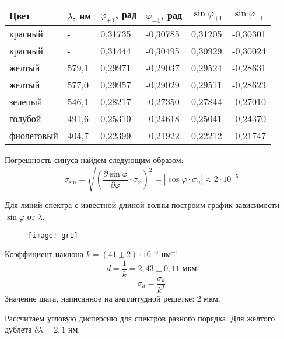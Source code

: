 	\begin{table}[H]
		\centering
		\begin{tabular}{|l|l|l|l|l|l|}
			\hline
			Цвет       & $\lambda$, нм & $\varphi_{+1}$, рад & $\varphi_{-1}$, рад & $\sin{\varphi_{+1}}$ & $\sin{\varphi_{-1}}$ \\ \hline
			красный    & -             & 0,31735             & -0,30785            & 0,31205              & -0,30301             \\ \hline
			красный    & -             & 0,31444             & -0,30495            & 0,30929              & -0,30024             \\ \hline
			желтый     & 579,1         & 0,29971             & -0,29037            & 0,29524              & -0,28631             \\ \hline
			желтый     & 577,0         & 0,29957             & -0,29029            & 0,29511              & -0,28623             \\ \hline
			зеленый    & 546,1         & 0,28217             & -0,27350            & 0,27844              & -0,27010             \\ \hline
			голубой    & 491,6         & 0,25310             & -0,24618            & 0,25041              & -0,24370             \\ \hline
			фиолетовый & 404,7         & 0,22399             & -0,21922            & 0,22212              & -0,21747             \\ \hline
		\end{tabular}
	\end{table}

	Погрешность синуса найдем следующим образом:
	\[
		\sigma_{\sin} = \sqrt{\left(\frac{\partial \sin\varphi}{\partial \varphi}\cdot\sigma_\varphi \right)^2} = |\cos\varphi\cdot\sigma_\varphi| \approx 2\cdot 10^{-5}
	\]
	
	Для линий спектра с известной длиной волны построим график зависимости $\sin{\varphi}$ от $\lambda$.
	
	\begin{figure}[H]
		\centering
		\texttt{[image: gr1]}
	\end{figure}

	Коэффициент наклона $k = (41\pm2)\cdot 10^{-5}$ нм$^{-1}$
	\[
		d= \frac{1}{k} = 2,43 \pm 0,11 \text{ мкм}
	\]
	\[
		\sigma_d = \frac{\sigma_k}{k^2}
	\]
	Значение шага, написанное на амплитудной решетке: $2$ мкм.
	
	Рассчитаем угловую дисперсию для спектров разного порядка. Для желтого дублета $\delta\lambda = 2,1$ нм.
	
